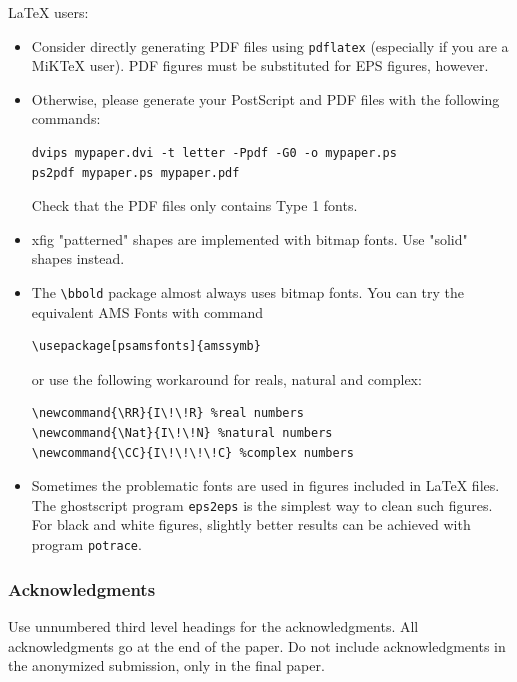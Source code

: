 \documentclass{article} %
\begin{document}
LaTeX users:

\begin{itemize}

\item Consider directly generating PDF files using \verb+pdflatex+
(especially if you are a MiKTeX user). 
PDF figures must be substituted for EPS figures, however.

\item Otherwise, please generate your PostScript and PDF files with the following commands:
\begin{verbatim} 
dvips mypaper.dvi -t letter -Ppdf -G0 -o mypaper.ps
ps2pdf mypaper.ps mypaper.pdf
\end{verbatim}

Check that the PDF files only contains Type 1 fonts. 

\item xfig "patterned" shapes are implemented with 
bitmap fonts.  Use "solid" shapes instead. 
\item The \verb+\bbold+ package almost always uses bitmap
fonts.  You can try the equivalent AMS Fonts with command
\begin{verbatim}
\usepackage[psamsfonts]{amssymb}
\end{verbatim}
 or use the following workaround for reals, natural and complex: 
\begin{verbatim}
\newcommand{\RR}{I\!\!R} %real numbers
\newcommand{\Nat}{I\!\!N} %natural numbers 
\newcommand{\CC}{I\!\!\!\!C} %complex numbers
\end{verbatim}

\item Sometimes the problematic fonts are used in figures
included in LaTeX files. The ghostscript program \verb+eps2eps+ is the simplest
way to clean such figures. For black and white figures, slightly better
results can be achieved with program \verb+potrace+.
\end{itemize}

\subsubsection*{Acknowledgments}

Use unnumbered third level headings for the acknowledgments. All
acknowledgments go at the end of the paper. Do not include 
acknowledgments in the anonymized submission, only in the 
final paper. 
\end{document}
